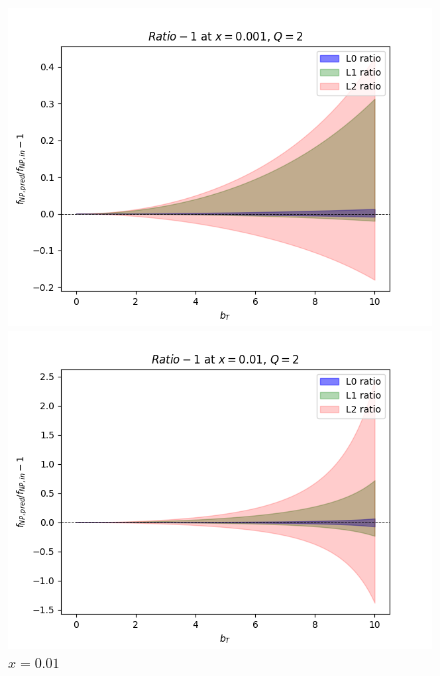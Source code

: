 \documentclass{article}
\begin{document}
\begin{itemize}
    \begin{figure}[H]
    \centering
    \begin{minipage}{0.45\textwidth}
        \centering
        \includegraphics[width=\textwidth]{Images/unc_levels/RealVsPredRatio_f_NP_Q_2_x_0.001.png}
        \caption{$x = 0.001$}
    \end{minipage}\hfill
    \begin{minipage}{0.45\textwidth}
        \centering
        \includegraphics[width=\textwidth]{Images/unc_levels/RealVsPredRatio_f_NP_Q_2_x_0.01.png}
        \caption{$x=0.01$}
    \end{minipage}
    \begin{minipage}{0.45\textwidth}
        \centering

\end{minipage}
\end{figure}
\end{itemize}
\end{document}
